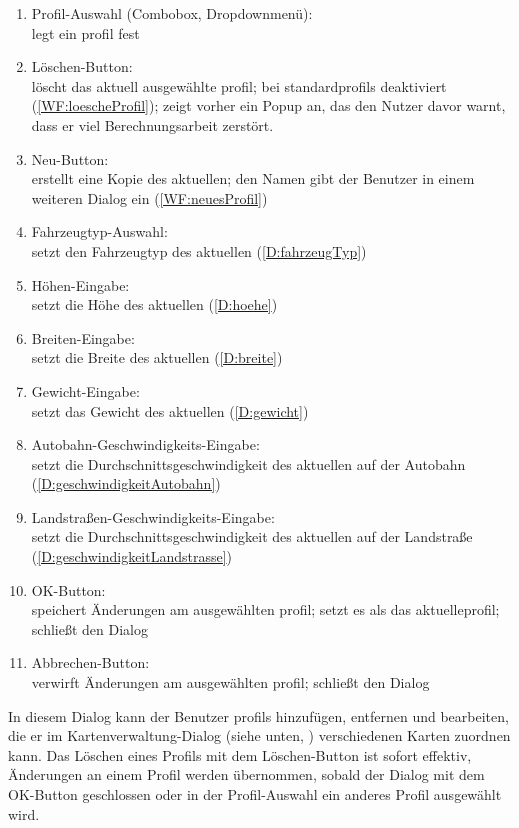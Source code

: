 \documentclass[a4paper, 11pt]{article}
\begin{document}
\begin{enumerate}
\item Profil-Auswahl (Combobox, Dropdownmenü):\\
legt ein \gls{profil} fest
\item Löschen-Button:\\
löscht das aktuell ausgewählte \gls{profil}; bei \glspl{standardprofil} deaktiviert (\ref{WF:loescheProfil}); zeigt vorher ein Popup an, das den Nutzer davor warnt, dass er viel Berechnungsarbeit zerstört. 
\item Neu-Button:\\
erstellt eine Kopie des aktuellen; den Namen gibt der Benutzer in einem weiteren Dialog ein (\ref{WF:neuesProfil})
\item Fahrzeugtyp-Auswahl:\\
setzt den Fahrzeugtyp des aktuellen  (\ref{D:fahrzeugTyp})
\item Höhen-Eingabe:\\
setzt die Höhe des aktuellen  (\ref{D:hoehe})
\item Breiten-Eingabe:\\
setzt die Breite des aktuellen  (\ref{D:breite})
\item Gewicht-Eingabe:\\
setzt das Gewicht des aktuellen  (\ref{D:gewicht})
\item Autobahn-Geschwindigkeits-Eingabe:\\
setzt die Durchschnittsgeschwindigkeit des aktuellen  auf der Autobahn (\ref{D:geschwindigkeitAutobahn})
\item Landstraßen-Geschwindigkeits-Eingabe:\\
setzt die Durchschnittsgeschwindigkeit des aktuellen  auf der Landstraße (\ref{D:geschwindigkeitLandstrasse})
\item OK-Button:\\
speichert Änderungen am ausgewählten \gls{profil}; setzt es als das aktuelle\gls{profil}; schließt den Dialog
\item Abbrechen-Button:\\
verwirft Änderungen am ausgewählten \gls{profil}; schließt den Dialog
\end{enumerate}

In diesem Dialog kann der Benutzer \glspl{profil} hinzufügen, entfernen und bearbeiten, die er im Kartenverwaltung-Dialog (siehe unten, ) verschiedenen Karten zuordnen kann. Das Löschen eines Profils mit dem Löschen-Button ist sofort effektiv, Änderungen an einem Profil werden übernommen, sobald der Dialog mit dem OK-Button geschlossen oder in der Profil-Auswahl ein anderes Profil ausgewählt wird.
\end{document}
